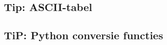 \documentclass[a4paper,12pt,twoside,openright,titlepage]{article}
\begin{document}
\subsection{Tip: ASCII-tabel}




% 

\subsection{TiP: Python conversie functies}



\printindex
\end{document}
